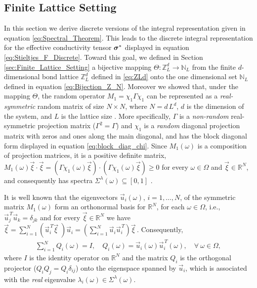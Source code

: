 \documentclass{cmslatex}
\newcommand\bsig{\mbox{\boldmath${\sigma}$}}
\begin{document}
\subsection{Finite Lattice Setting}
\label{sec:The_Spectral_Theorem_Finite_Lattice}
%
In this section we derive discrete versions of the integral
representation given in equation  \eqref{eq:Spectral_Theorem}. This
leads to the discrete integral representation for the effective
conductivity tensor $\bsig^*$ displayed in equation
\eqref{eq:Stieltjes_F_Discrete}. Toward this goal, we defined in
Section \ref{sec:Finite_Lattice_Setting} a bijective mapping
$\Theta:\mathbb{Z}_L^d\to\mathbb{N}_L$ from the finite $d$-dimensional bond
lattice $\mathbb{Z}_L^d$ defined in \eqref{eq:ZLd} onto the one
dimensional set $\mathbb{N}_L$ defined in equation
\eqref{eq:Bijection_Z_N}. Moreover we showed that, under the mapping
$\Theta$, the random operator $M_1=\chi_1\Gamma\chi_1$ can be represented as a
\emph{real-symmetric} random matrix of size $N\times N$, where $N=d\,L^d$,
$d$ is the dimension of the system, and $L$ is the lattice size
\cite{Golden:JBM:337,Murphy:JMP:063506}. More specifically, $\Gamma$
is a \emph{non-random} real-symmetric projection matrix ($\Gamma^2=\Gamma$) and
$\chi_1$ is a \emph{random} diagonal projection matrix with zeros and
ones along the main diagonal, and has the block diagonal form
displayed in equation \eqref{eq:block_diag_chi}. Since $M_1(\omega)$ is a
composition of projection matrices, it is a positive definite matrix,
$M_1(\omega)\vec{\xi}\cdot\vec{\xi}=(\Gamma\chi_1(\omega)\vec{\xi})\cdot(\Gamma\chi_1(\omega)\vec{\xi})\geq0$ for every
$\omega\in\Omega$ and $\vec{\xi}\in\mathbb{R}^N$, and consequently has spectra
$\Sigma^\lambda(\omega)\subseteq[0,1]$ \cite{Horn_Johnson-1990,Demmel:1997}.   






It is well known \cite{Horn_Johnson-1990,Keener-2000} that the
eigenvectors $\vec{u}_i(\omega)$, $i=1,\ldots,N$, of the symmetric matrix
$M_1(\omega)$ form an orthonormal 
basis for $\mathbb{R}^N$, for each $\omega\in\Omega$, i.e., 
$\vec{u}_j^{\,T}\vec{u}_k=\delta_{jk}$  and for every
$\vec{\xi}\in\mathbb{R}^N$ we have
$\vec{\xi}=\sum_{i=1}^N(\vec{u}_i^{\,T}\vec{\xi}\;)\vec{u}_i  
=\left(\sum_{i=1}^N\vec{u}_i\vec{u}_i^{\,T}\right)\vec{\xi}\,$. Consequently,       
%
\begin{align}\label{eq:Matrix_Rep_Spec_Theorem}
  \sum_{i=1}^NQ_i(\omega)=I, \quad
  Q_i(\omega)=\vec{u}_i(\omega)\vec{u}_i^{\,T}(\omega),  \quad
  \forall \     \omega\in\Omega,
\end{align}
%
where $I$ is the identity operator on $\mathbb{R}^N$ and the matrix
$Q_i$ is the orthogonal projector ($Q_iQ_j=Q_i\delta_{ij}$) onto the
eigenspace spanned by $\vec{u}_i$, which is associated with the
\emph{real} eigenvalue $\lambda_i(\omega)\in\Sigma^\lambda(\omega)$. 
\end{document}
